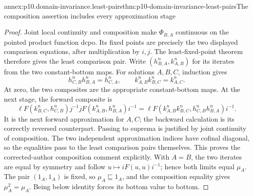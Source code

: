 \begin{annexitem}{annex:p10.domain-invariance.least-pairs}{thm:p10-domain-invariance-least-pairs}{The composition assertion includes every approximation stage}
\begin{proof}
Joint local continuity and composition make \(\Phi_{B,A}\)
continuous on the pointed product function dcpo. Its fixed points
are precisely the two displayed comparison equations, after
multiplication by \(i,j\). The least-fixed-point theorem therefore
gives the least comparison pair.
Write \((h^n_{B,A},k^n_{A,B})\) for its iterates from the two
constant-bottom maps. For solutions \(A,B,C\), induction gives
\[
 h^n_{C,B}h^n_{B,A}=h^n_{C,A},\qquad
 k^n_{A,B}k^n_{B,C}=k^n_{A,C}.
\]
At zero, the two composites are the appropriate constant-bottom
maps. At the next stage, the forward composite is
\[
 \ell F(k^n_{B,C},h^n_{C,B})j^{-1}
       jF(k^n_{A,B},h^n_{B,A})i^{-1}
 =\ell F(k^n_{A,B}k^n_{B,C},
                 h^n_{C,B}h^n_{B,A})i^{-1}.
\]
It is the next forward approximation for \(A,C\); the backward
calculation is its correctly reversed counterpart. Passing to
suprema is justified by joint continuity of composition. The
two independent approximation indices have cofinal diagonal,
so the equalities pass to the least comparison pairs themselves.
This proves the corrected-author composition comment explicitly.
With \(A=B\), the two iterates are equal by symmetry and follow
\(u\mapsto iF(u,u)i^{-1}\); hence both limits equal \(\mu_A\).
The pair \((1_A,1_A)\) is fixed, so \(\mu_A\sqsubseteq1_A\),
and the composition equality gives \(\mu_A^2=\mu_A\).
Being below identity forces its bottom value to bottom.
\end{proof}
\end{annexitem}

